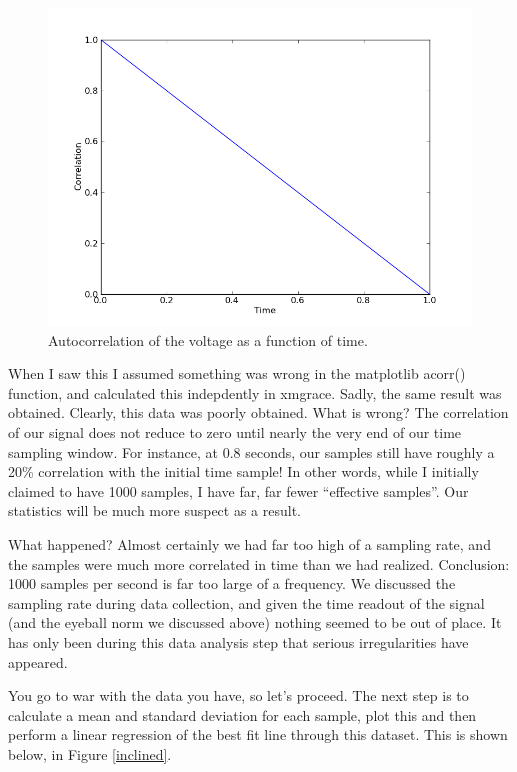 \documentclass{article}
\begin{document}
  \begin{figure}[!htb]
   \begin{center}
    \includegraphics[width = 12 cm]{figs/incl_auto.png}
    \caption{Autocorrelation of the voltage as a function of time.}
    \label{incl-hist}
   \end{center}
  \end{figure}

When I saw this I assumed something was wrong in the matplotlib acorr()
function, and calculated this indepdently in xmgrace. Sadly, the same
result was obtained. Clearly, this data was poorly obtained. What is
wrong? The correlation of our signal does not reduce to zero until
nearly the very end of our time sampling window. For instance, at 0.8
seconds, our samples still have roughly a 20\% correlation with the
initial time sample! In other words, while I initially claimed to have
1000 samples, I have far, far fewer ``effective samples''. Our
statistics will be much more suspect as a result. 

What happened? Almost certainly we had far too high of a sampling
rate, and the samples were much more correlated in time than we had
realized. Conclusion: 1000 samples per second is far too large of a
frequency. We discussed the sampling rate during data collection, and
given the time readout of the signal (and the eyeball norm we discussed
above) nothing seemed to be out of place. It has only been during this
data analysis step that serious irregularities have appeared. 

You go to war with the data you have, so let's proceed. The next step is
to calculate a mean and standard deviation for each sample, plot this
and then perform a linear regression of the best fit line through this
dataset. This is shown below, in Figure \ref{inclined}. 
\end{document}
